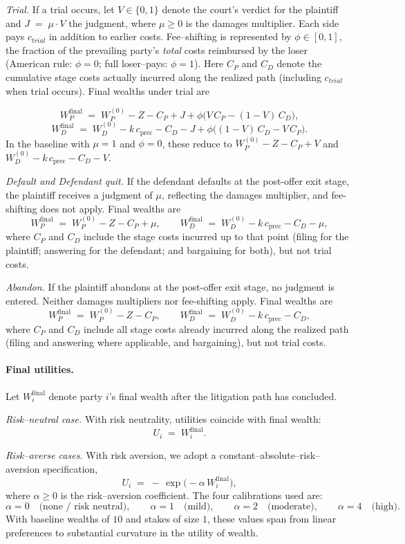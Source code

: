 \documentclass{article}
\begin{document}
\emph{Trial.} If a trial occurs, let $V\in\{0,1\}$ denote the court’s verdict for the plaintiff and $J \;=\; \mu \cdot V$ the judgment, where $\mu\ge 0$ is the damages multiplier. Each side pays $c_{trial}$ in addition to earlier costs. Fee–shifting is represented by $\phi\in[0,1]$, the fraction of the prevailing party’s \emph{total} costs reimbursed by the loser (American rule: $\phi=0$; full loser–pays: $\phi=1$). Here $C_P$ and $C_D$ denote the cumulative stage costs actually incurred along the realized path (including $c_{trial}$ when trial occurs). Final wealths under trial are

\[
W_P^{\mathrm{final}}
\;=\;
W_P^{(0)} - Z - C_P + J + \phi\bigl(V\,C_P - (1-V)\,C_D\bigr),
\]
\[
W_D^{\mathrm{final}}
\;=\;
W_D^{(0)} - k\,c_{\mathrm{prec}} - C_D - J + \phi\bigl((1-V)\,C_D - V\,C_P\bigr).
\]
In the baseline with $\mu=1$ and $\phi=0$, these reduce to $W_P^{(0)}-Z-C_P+V$ and $W_D^{(0)}-k\,c_{\mathrm{prec}}-C_D-V$.

\emph{Default and Defendant quit.} If the defendant defaults at the post-offer exit stage, the plaintiff receives a judgment of $\mu$, reflecting the damages multiplier, and fee-shifting does not apply. Final wealths are
\[
W_P^{\mathrm{final}} \;=\; W_P^{(0)} - Z - C_P + \mu,
\qquad
W_D^{\mathrm{final}} \;=\; W_D^{(0)} - k\,c_{\mathrm{prec}} - C_D - \mu,
\]
where $C_P$ and $C_D$ include the stage costs incurred up to that point (filing for the plaintiff; answering for the defendant; and bargaining for both), but not trial costs.

\emph{Abandon.} If the plaintiff abandons at the post-offer exit stage, no judgment is entered. Neither damages multipliers nor fee-shifting apply. Final wealths are
\[
W_P^{\mathrm{final}} \;=\; W_P^{(0)} - Z - C_P,
\qquad
W_D^{\mathrm{final}} \;=\; W_D^{(0)} - k\,c_{\mathrm{prec}} - C_D,
\]
where $C_P$ and $C_D$ include all stage costs already incurred along the realized path (filing and answering where applicable, and bargaining), but not trial costs.

\paragraph{Final utilities.}
Let $W_i^{\mathrm{final}}$ denote party $i$'s final wealth after the litigation path has concluded.

\emph{Risk–neutral case.} With risk neutrality, utilities coincide with final wealth:
\[
U_i \;=\; W_i^{\mathrm{final}}.
\]

\emph{Risk–averse cases.} With risk aversion, we adopt a constant–absolute–risk–aversion specification,
\[
U_i \;=\; -\,\exp\!\bigl(-\alpha\,W_i^{\mathrm{final}}\bigr),
\]
where $\alpha\ge 0$ is the risk–aversion coefficient. The four calibrations used are:
\[
\alpha = 0 \quad\text{(none / risk neutral)},\qquad
\alpha = 1 \quad\text{(mild)},\qquad
\alpha = 2 \quad\text{(moderate)},\qquad
\alpha = 4 \quad\text{(high)}.
\]
With baseline wealths of $10$ and stakes of size $1$, these values span from linear preferences to substantial curvature in the utility of wealth.
\end{document}
